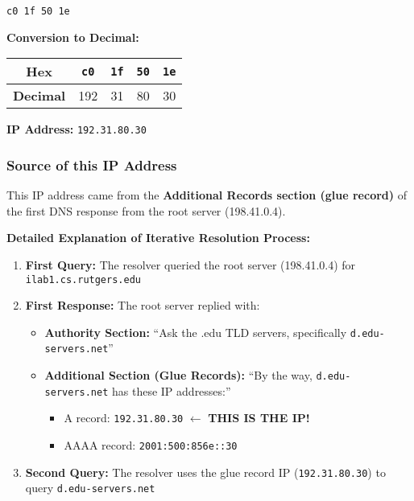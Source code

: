 \documentclass[11pt,letterpaper]{article}
\begin{document}
\begin{hexbox}
\begin{lstlisting}[style=hexstyle]
c0 1f 50 1e
\end{lstlisting}
\end{hexbox}

\textbf{Conversion to Decimal:}
\begin{center}
\begin{tabular}{ccccc}
\toprule
\textbf{Hex} & \texttt{c0} & \texttt{1f} & \texttt{50} & \texttt{1e} \\
\midrule
\textbf{Decimal} & 192 & 31 & 80 & 30 \\
\bottomrule
\end{tabular}
\end{center}

\textbf{IP Address:} \texttt{192.31.80.30}

\subsubsection{Source of this IP Address}

This IP address came from the \textbf{Additional Records section (glue record)} of the first DNS response from the root server (198.41.0.4).

\textbf{Detailed Explanation of Iterative Resolution Process:}

\begin{enumerate}
    \item \textbf{First Query:} The resolver queried the root server (198.41.0.4) for \texttt{ilab1.cs.rutgers.edu}
    
    \item \textbf{First Response:} The root server replied with:
    \begin{itemize}
        \item \textbf{Authority Section:} ``Ask the .edu TLD servers, specifically \texttt{d.edu-servers.net}''
        \item \textbf{Additional Section (Glue Records):} ``By the way, \texttt{d.edu-servers.net} has these IP addresses:''
        \begin{itemize}
            \item A record: \texttt{192.31.80.30} $\leftarrow$ \textbf{THIS IS THE IP!}
            \item AAAA record: \texttt{2001:500:856e::30}
        \end{itemize}
    \end{itemize}
    
    \item \textbf{Second Query:} The resolver uses the glue record IP (\texttt{192.31.80.30}) to query \texttt{d.edu-servers.net}
\end{enumerate}
\end{document}
